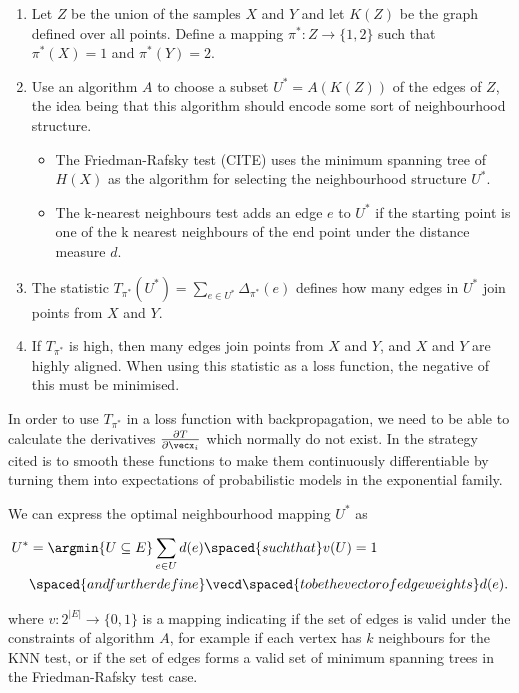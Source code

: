 \begin{enumerate}
    \item Let $Z$ be the union of the samples $X$ and $Y$ and let $K(Z)$ be the graph defined over all points. Define a mapping $\pi^* : Z \rightarrow \{1, 2\}$ such that $\pi^*(X) = 1$ and $\pi^*(Y) = 2$.
    \item Use an algorithm $A$ to choose a subset $U^* = A(K(Z))$ of the edges of $Z$, the idea being that this algorithm should encode some sort of neighbourhood structure.
    \begin{itemize}
        \item The Friedman-Rafsky test (CITE) uses the minimum spanning tree of $H(X)$ as the algorithm for selecting the neighbourhood structure $U^*$. 

        \item The k-nearest neighbours test adds an edge $e$ to $U^*$ if the starting point is one of the k nearest neighbours of the end point under the distance measure $d$.
    \end{itemize}
    \item The statistic $T_{\pi^*}(U^*) = \sum_{e \in U^*} \Delta_{\pi^*} (e)$ defines how many edges in $U^*$ join points from $X$ and $Y$. 
    \item If $T_{\pi^*}$ is high, then many edges join points from $X$ and $Y$, and $X$ and $Y$ are highly aligned. When using this statistic as a loss function, the negative of this must be minimised.
\end{enumerate}


In order to use $T_{\pi^*}$ in a loss function with backpropagation, we need to be able to calculate the derivatives $\frac{\partial T}{\partial \vecx_i}$ which normally do not exist. In \cite{torchtwosample} the strategy cited is to smooth these functions to make them continuously differentiable by turning them into expectations of probabilistic models in the exponential family. 


We can express the optimal neighbourhood mapping $U^*$ as 

\begin{equation}
\begin{split}
U^* &= \argmin{U \subseteq E} \sum_{e \in U} d(e) \spaced{such that} v(U) = 1 \\
&\spaced{and further define} \vecd \spaced{to be the vector of edge weights} d(e). 
\end{split}
\end{equation}

where $v: 2^{|E|} \rightarrow \{0, 1 \}$ is a mapping indicating if the set of edges is valid under the constraints of algorithm $A$, for example if each vertex has $k$ neighbours for the KNN test, or if the set of edges forms a valid set of minimum spanning trees in the Friedman-Rafsky test case. 

